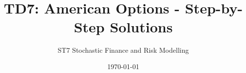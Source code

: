 \documentclass{article}
\begin{document}
\title{TD7: American Options - Step-by-Step Solutions}
\author{ST7 Stochastic Finance and Risk Modelling}
\date{\today}

\maketitle

\tableofcontents
\newpage





\end{document}
